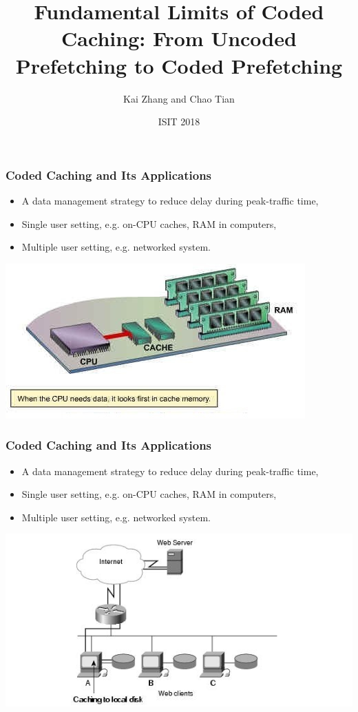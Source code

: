 \documentclass{beamer}
\title[About Beamer] %
{Fundamental Limits of Coded Caching: From Uncoded Prefetching to Coded Prefetching}
\author{Kai Zhang and Chao Tian}
\institute{Texas A\&M University}
\date{ISIT 2018}
\begin{document}
\frame{\titlepage}

\begin{frame}
\frametitle{Coded Caching and Its Applications}
  \begin{itemize}
  \item A data management strategy to reduce delay during peak-traffic time,
  \item Single user setting, e.g. on-CPU caches, RAM in computers,
  \item Multiple user setting, e.g. networked system.
  \end{itemize}
  \vspace{0.5cm}
  \centering
  \includegraphics[scale = 0.72]{cacheonRAM.jpg} 
\end{frame}
 
\begin{frame}
\frametitle{Coded Caching and Its Applications}
  \begin{itemize}
  \item A data management strategy to reduce delay during peak-traffic time,
  \item Single user setting, e.g. on-CPU caches, RAM in computers,
  \item Multiple user setting, e.g. networked system.
  \end{itemize}
  \vspace{0.5cm}
  \centering
  \includegraphics[scale = 0.6]{networkCaching.jpg} 
\end{frame}
\end{document}
